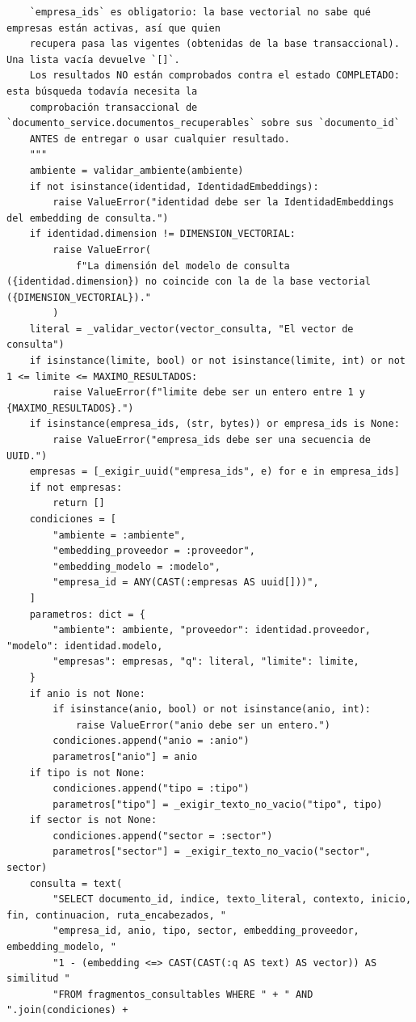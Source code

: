 \documentclass[11pt,a4paper]{article}
\begin{document}
\begin{lstlisting}
    `empresa_ids` es obligatorio: la base vectorial no sabe qué empresas están activas, así que quien
    recupera pasa las vigentes (obtenidas de la base transaccional). Una lista vacía devuelve `[]`.
    Los resultados NO están comprobados contra el estado COMPLETADO: esta búsqueda todavía necesita la
    comprobación transaccional de `documento_service.documentos_recuperables` sobre sus `documento_id`
    ANTES de entregar o usar cualquier resultado.
    """
    ambiente = validar_ambiente(ambiente)
    if not isinstance(identidad, IdentidadEmbeddings):
        raise ValueError("identidad debe ser la IdentidadEmbeddings del embedding de consulta.")
    if identidad.dimension != DIMENSION_VECTORIAL:
        raise ValueError(
            f"La dimensión del modelo de consulta ({identidad.dimension}) no coincide con la de la base vectorial ({DIMENSION_VECTORIAL})."
        )
    literal = _validar_vector(vector_consulta, "El vector de consulta")
    if isinstance(limite, bool) or not isinstance(limite, int) or not 1 <= limite <= MAXIMO_RESULTADOS:
        raise ValueError(f"limite debe ser un entero entre 1 y {MAXIMO_RESULTADOS}.")
    if isinstance(empresa_ids, (str, bytes)) or empresa_ids is None:
        raise ValueError("empresa_ids debe ser una secuencia de UUID.")
    empresas = [_exigir_uuid("empresa_ids", e) for e in empresa_ids]
    if not empresas:
        return []
    condiciones = [
        "ambiente = :ambiente",
        "embedding_proveedor = :proveedor",
        "embedding_modelo = :modelo",
        "empresa_id = ANY(CAST(:empresas AS uuid[]))",
    ]
    parametros: dict = {
        "ambiente": ambiente, "proveedor": identidad.proveedor, "modelo": identidad.modelo,
        "empresas": empresas, "q": literal, "limite": limite,
    }
    if anio is not None:
        if isinstance(anio, bool) or not isinstance(anio, int):
            raise ValueError("anio debe ser un entero.")
        condiciones.append("anio = :anio")
        parametros["anio"] = anio
    if tipo is not None:
        condiciones.append("tipo = :tipo")
        parametros["tipo"] = _exigir_texto_no_vacio("tipo", tipo)
    if sector is not None:
        condiciones.append("sector = :sector")
        parametros["sector"] = _exigir_texto_no_vacio("sector", sector)
    consulta = text(
        "SELECT documento_id, indice, texto_literal, contexto, inicio, fin, continuacion, ruta_encabezados, "
        "empresa_id, anio, tipo, sector, embedding_proveedor, embedding_modelo, "
        "1 - (embedding <=> CAST(CAST(:q AS text) AS vector)) AS similitud "
        "FROM fragmentos_consultables WHERE " + " AND ".join(condiciones) +

\end{lstlisting}
\end{document}
